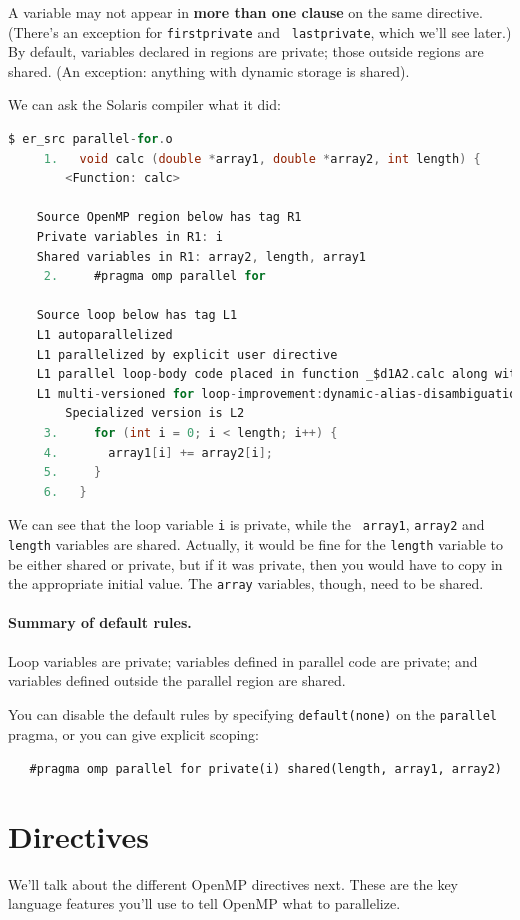 \documentclass[a4paper]{report}
\begin{document}
A variable may not appear in {\bf more than one clause} on the same
directive. (There's an exception for {\tt firstprivate} and {\tt
  lastprivate}, which we'll see later.) By default, variables
declared in regions are private; those outside regions are
shared. (An exception: anything with dynamic storage is
shared).


We can ask the Solaris compiler what it did:
{ 
\begin{lstlisting}[language=C,morekeywords={foreach,pragma,omp,parallel,single,nowait,task,untied,barrier,taskyield}]
$ er_src parallel-for.o
     1.   void calc (double *array1, double *array2, int length) {
        <Function: calc>
    
    Source OpenMP region below has tag R1
    Private variables in R1: i
    Shared variables in R1: array2, length, array1
     2.     #pragma omp parallel for
    
    Source loop below has tag L1
    L1 autoparallelized
    L1 parallelized by explicit user directive
    L1 parallel loop-body code placed in function _$d1A2.calc along with 0 inner loops
    L1 multi-versioned for loop-improvement:dynamic-alias-disambiguation. 
        Specialized version is L2
     3.     for (int i = 0; i < length; i++) {
     4.       array1[i] += array2[i];
     5.     }
     6.   }
\end{lstlisting}
}

We can see that the loop variable {\tt i} is private, while the {\tt
  array1}, {\tt array2} and {\tt length} variables are shared.
Actually, it would be fine for the {\tt length} variable to be either
shared or private, but if it was private, then you would have to copy
in the appropriate initial value. The {\tt array} variables, though, 
need to be shared.

\paragraph{Summary of default rules.} Loop variables are private; 
variables defined in parallel code are private; and variables defined
outside the parallel region are shared.

You can disable the default rules by specifying {\tt default(none)}
on the {\tt parallel} pragma, or you can give explicit scoping:

\verb+   #pragma omp parallel for private(i) shared(length, array1, array2)+

\section*{Directives}
We'll talk about the different OpenMP directives next. These are the key
language features you'll use to tell OpenMP what to parallelize.
\end{document}
